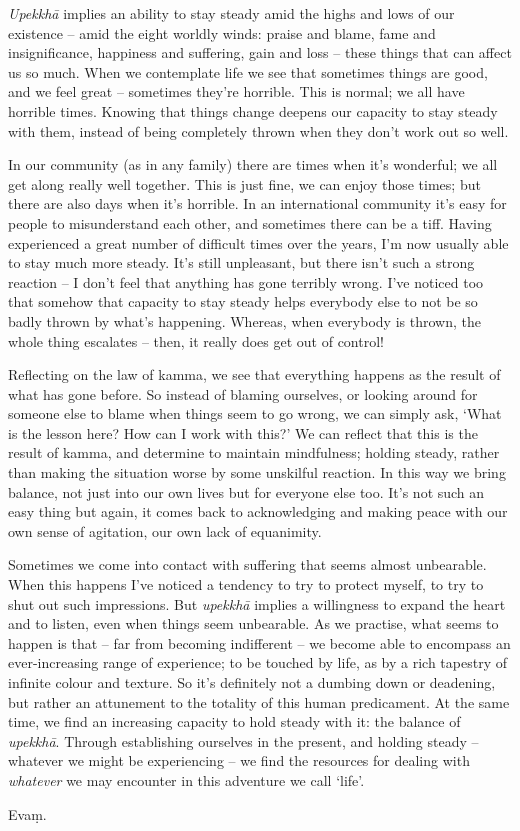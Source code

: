 \textit{Upekkh\=a} implies an ability to stay steady amid the highs and lows of our existence -- amid the eight worldly winds: praise and blame, fame and insignificance, happiness and suffering, gain and loss -- these things that can affect us so much. When we contemplate life we see that sometimes things are good, and we feel great -- sometimes they're horrible. This is normal; we all have horrible times. Knowing that things change deepens our capacity to stay steady with them, instead of being completely thrown when they don't work out so well.

In our community (as in any family) there are times when it's wonderful; we all get along really well together. This is just fine, we can enjoy those times; but there are also days when it's horrible. In an international community it's easy for people to misunderstand each other, and sometimes there can be a tiff. Having experienced a great number of difficult times over the years, I'm now usually able to stay much more steady. It's still unpleasant, but there isn't such a strong reaction -- I don't feel that anything has gone terribly wrong. I've noticed too that somehow that capacity to stay steady helps everybody else to not be so badly thrown by what's happening. Whereas, when everybody is thrown, the whole thing escalates -- then, it really does get out of control!

Reflecting on the law of kamma, we see that everything happens as the result of what has gone before. So instead of blaming ourselves, or looking around for someone else to blame when things seem to go wrong, we can simply ask, `What is the lesson here? How can I work with this?' We can reflect that this is the result of kamma, and determine to maintain mindfulness; holding steady, rather than making the situation worse by some unskilful reaction. In this way we bring balance, not just into our own lives but for everyone else too. It's not such an easy thing but again, it comes back to acknowledging and making peace with our own sense of agitation, our own lack of equanimity.

Sometimes we come into contact with suffering that seems almost unbearable. When this happens I've noticed a tendency to try to protect myself, to try to shut out such impressions. But \textit{upekkh\=a} implies a willingness to expand the heart and to listen, even when things seem unbearable. As we practise, what seems to happen is that -- far from becoming indifferent -- we become able to encompass an ever-increasing range of experience; to be touched by life, as by a rich tapestry of infinite colour and texture. So it's definitely not a dumbing down or deadening, but rather an attunement to the totality of this human predicament. At the same time, we find an increasing capacity to hold steady with it: the balance of \textit{upekkh\=a}. Through establishing ourselves in the present, and holding steady -- whatever we might be experiencing -- we find the resources for dealing with \textit{whatever} we may encounter in this adventure we call `life'. 

Eva\d{m}.

